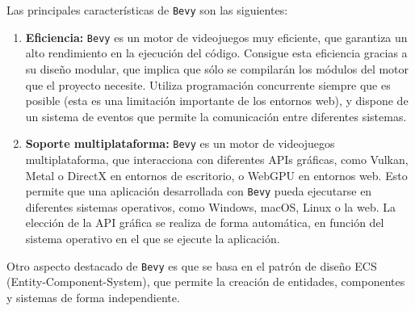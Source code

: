 Las principales características de \texttt{Bevy} son las siguientes:
\begin{enumerate}
    \item \textbf{Eficiencia:} \texttt{Bevy} es un motor de videojuegos muy eficiente, que garantiza un alto rendimiento en la ejecución del código. Consigue esta eficiencia gracias a su diseño modular, que implica que sólo se compilarán los módulos del motor que el proyecto necesite. Utiliza programación concurrente siempre que es posible (esta es una limitación importante de los entornos web), y dispone de un sistema de eventos que permite la comunicación entre diferentes sistemas.
    \item \textbf{Soporte multiplataforma:} \texttt{Bevy} es un motor de videojuegos multiplataforma, que interacciona con diferentes APIs gráficas, como Vulkan, Metal o DirectX en entornos de escritorio, o WebGPU en entornos web. Esto permite que una aplicación desarrollada con \texttt{Bevy} pueda ejecutarse en diferentes sistemas operativos, como Windows, macOS, Linux o la web. La elección de la API gráfica se realiza de forma automática, en función del sistema operativo en el que se ejecute la aplicación.
\end{enumerate}

Otro aspecto destacado de \texttt{Bevy} es que se basa en el patrón de diseño ECS (Entity-Component-System), que permite la creación de entidades, componentes y sistemas de forma independiente. 